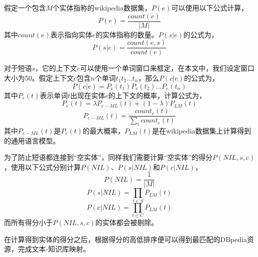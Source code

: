 假定一个包含$M$个实体指称的wikipedia数据集，$P(e)$可以使用以下公式计算，
\begin{equation}
P(e) = \frac{count(e)}{|M|}
\end{equation}
其中$count(e)$表示指向实体$e$的实体指称的数量。$P(s|e)$的公式为，
\begin{equation}
P(s|e) = \frac{count(e,s)}{count(e)}
\end{equation}

对于短语$s$，它的上下文$c$可以使用一个单词窗口来框定，在本文中，我们设定窗口大小为50。假定上下文$c$包含$n$个单词$t_1t_2...t_n$，那么$P(c|e)$的公式为，
\begin{equation}
P(c|e) = P_e(t_1)P_e(t_2)...P_e(t_n)
\end{equation}
其中$P_e(t)$表示单词$t$出现在实体$e$的上下文的概率，计算公式为，
\begin{equation}
P_e(t) = \lambda P_{e-ML}(t) + (1-\lambda)P_{LM}(t)
\end{equation}
\begin{equation}
P_{e-ML}(t) = \frac{count_e(t)}{\sum_t count_e(t)}
\end{equation}
其中$P_{e-ML}(t)$是$P_e(t)$的最大概率，$P_{LM}(t)$是在wikipedia数据集上计算得到的通用语言模型。

为了防止短语都连接到“空实体”，同样我们需要计算“空实体”的得分$P(NIL,s,c)$，使用以下公式分别计算$P(NIL)$、$P(s|NIL)$和$P(c|NIL)$，
\begin{equation}
P(NIL) = \frac{1}{|M|}
\end{equation}
\begin{equation}
P(s|NIL) = \prod_{t\in S}P_{LM}(t)
\end{equation}
\begin{equation}
P(c|NIL) = \prod_{t\in C}P_{LM}(t)
\end{equation}
而所有得分小于$P(NIL,s,c)$的实体都会被剔除。

在计算得到实体的得分之后，根据得分的高低排序便可以得到最匹配的DBpedia资源，完成文本-知识库映射。


